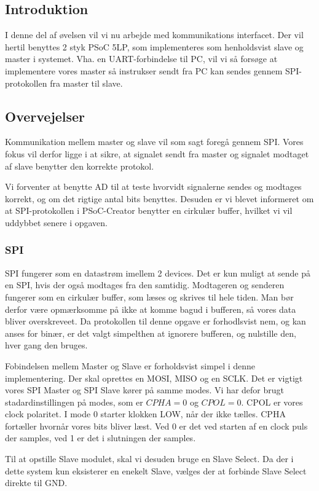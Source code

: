 \documentclass[../main.tex]{subfiles}
\begin{document}
\subsection{Introduktion}
I denne del af øvelsen vil vi nu arbejde med kommunikations interfacet. Der vil hertil benyttes 2 styk PSoC 5LP, som implementeres som henholdsvist slave og master i systemet.
 Vha. en UART-forbindelse til PC, vil vi så forsøge at implementere vores master så instrukser sendt fra PC kan sendes gennem SPI-protokollen fra master til slave.

\subsection{Overvejelser}
Kommunikation mellem master og slave vil som sagt foregå gennem SPI. Vores fokus vil derfor ligge i at sikre, at signalet sendt fra master og signalet modtaget af slave benytter den korrekte protokol.

Vi forventer at benytte AD til at teste hvorvidt signalerne sendes og modtages korrekt, og om det rigtige antal bits benyttes. Desuden er vi blevet informeret om at SPI-protokollen i PSoC-Creator benytter en cirkulær buffer, hvilket vi vil uddybbet senere i opgaven.

\subsubsection{SPI}

SPI fungerer som en datastrøm imellem 2 devices. Det er kun muligt at sende på en SPI, hvis der også modtages fra den samtidig. Modtageren og senderen fungerer som en cirkulær buffer, som læses og skrives til hele tiden. Man bør derfor være opmærksomme på ikke at komme bagud i bufferen, så vores data bliver overskreveet. Da protokollen til denne opgave er forhodlsvist nem, og kan anses for binær, er det valgt simpelthen at ignorere bufferen, og nulstille den, hver gang den bruges.

Fobindelsen mellem Master og Slave er forholdsvist simpel i denne implementering. Der skal oprettes en MOSI, MISO og en SCLK. Det er vigtigt vores SPI Master og SPI Slave kører på samme modes. Vi har defor brugt stadardinstillingen på modes, som er \(CPHA=0\) og \(CPOL = 0\). CPOL er vores clock polaritet. I mode 0 starter klokken LOW, når der ikke tælles. CPHA fortæller hvornår vores bits bliver læst. Ved 0 er det ved starten af en clock puls der samples, ved 1 er det i slutningen der samples.

Til at opstille Slave modulet, skal vi desuden bruge en Slave Select. Da der i dette system kun eksisterer en enekelt Slave, vælges der at forbinde Slave Select direkte til GND.
\end{document}
